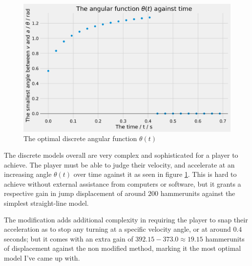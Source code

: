 \begin{figure}[H]
    \centering
    \includegraphics[width=0.8\linewidth]{assets/step_by_step_acc.png}
        \caption{The optimal discrete angular function $\theta(t)$}
        \label{fig:sbsa}
\end{figure}


The discrete models overall are very complex and sophisticated for a player to achieve. The player must be able to judge their velocity, and accelerate at an increasing angle $\theta(t)$ over time against it as seen in figure \ref{fig:sbsa}. This is hard to achieve without external assistance from computers or software, but it grants a respective gain in jump displacement of around $200$ hammerunits against the simplest straight-line model.

The modification adds additional complexity in requiring the player to snap their acceleration as to stop any turning at a specific velocity angle, or at around $0.4$ seconds; but it comes with an extra gain of $392.15-373.0\approx19.15$ hammerunits of displacement against the non modified method, marking it the most optimal model I've came up with.


